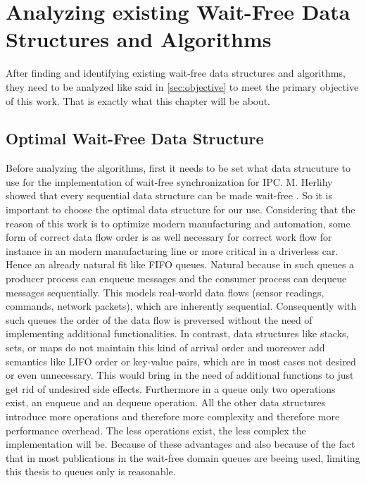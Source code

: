 \chapter{Analyzing existing Wait-Free Data Structures and Algorithms}\label{ch:choosing-the-optimal-wait-free-data-structure}
After finding and identifying existing wait-free data structures and algorithms, they need to be analyzed like said in \cref{sec:objective} to meet the primary objective of this work. That is exactly what this chapter will be about.

\section{Optimal Wait-Free Data Structure}\label{sec:optimal-wait-free-data-structure}
Before analyzing the algorithms, first it needs to be set what data strucuture to use for the implementation of wait-free synchronization for \ac{IPC}. M. Herlihy showed that every sequential data structure can be made wait-free \cite{herlihy1991wait}. So it is important to choose the optimal data structure for our use. Considering that the reason of this work is to optimize modern manufacturing and automation, some form of correct data flow order is as well necessary for correct work flow for instance in an modern manufacturing line or more critical in a driverless car. Hence an already natural fit like \ac{FIFO} queues. Natural because in such queues a producer process can enqueue messages and the consumer process can dequeue messages sequentially. This models real-world data flows (sensor readings, commands, network packets), which are inherently sequential. Consequently with such queues the order of the data flow is preversed without the need of implementing additional functionalities. In contrast, data structures like stacks, sets, or maps do not maintain this kind of arrival order and moreover add semantics like \ac{LIFO} order or key-value pairs, which are in most cases not desired or even unnecessary. This would bring in the need of additional functions to just get rid of undesired side effects. Furthermore in a queue only two operations exist, an enqueue and an dequeue operation. All the other data structures introduce more operations and therefore more complexity and therefore more performance overhead. The less operations exist, the less complex the implementation will be. Because of these advantages and also because of the fact that in most publications in the wait-free domain queues are beeing used, limiting this thesis to queues only is reasonable. \cite{jiffy}


